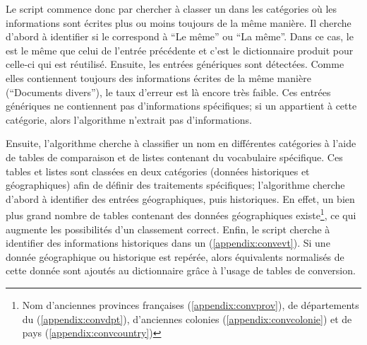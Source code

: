 Le script commence donc par chercher à classer un \tname{} dans les catégories où les informations sont écrites plus ou moins toujours de la même manière. Il cherche d'abord à identifier si le \tname{} correspond à \enquote{Le même} ou \enquote{La même}. Dans ce cas, le \tname{} est le même que celui de l'entrée précédente et c'est le \gls{dictionnaire} produit pour celle-ci qui est réutilisé. Ensuite, les entrées génériques sont détectées. Comme elles contiennent toujours des informations écrites de la même manière (\enquote{Documents divers}), le taux d'erreur est là encore très faible. Ces entrées génériques ne contiennent pas d'informations spécifiques; si un \tname{} appartient à cette catégorie, alors l'algorithme n'extrait pas d'informations. 

Ensuite, l'algorithme cherche à classifier un nom en différentes catégories à l'aide de tables de comparaison et de listes contenant du vocabulaire spécifique. Ces tables et listes sont classées en deux catégories (données historiques et géographiques) afin de définir des traitements spécifiques; l'algorithme cherche d'abord à identifier des entrées géographiques, puis historiques. En effet, un bien plus grand nombre de tables contenant des données géographiques existe\footnote{Nom d'anciennes provinces françaises (\ref{appendix:convprov}), de départements du  (\ref{appendix:convdpt}), d'anciennes colonies (\ref{appendix:convcolonie}) et de pays (\ref{appendix:convcountry})}, ce qui augmente les possibilités d'un classement correct. Enfin, le script cherche à identifier des informations historiques dans un \tname{} (\ref{appendix:convevt}). Si une donnée géographique ou historique est repérée, alors équivalents normalisés de cette donnée sont ajoutés au \gls{dictionnaire} grâce à l'usage de tables de conversion.

